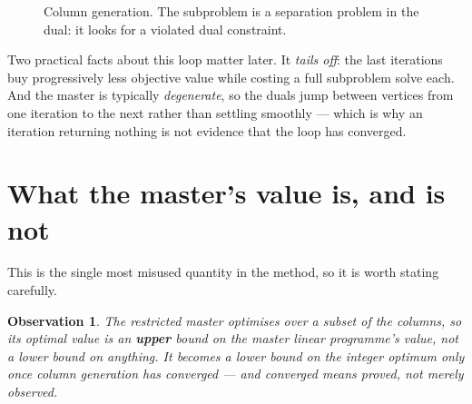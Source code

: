 \documentclass[11pt,a4paper]{article}
\newtheorem{observation}{Observation}
\begin{document}
\begin{figure}[h!]
\centering
{}
\caption{Column generation. The subproblem is a separation problem in the dual:
it looks for a violated dual constraint.}
\end{figure}

Two practical facts about this loop matter later. It \emph{tails off}: the last
iterations buy progressively less objective value while costing a full
subproblem solve each. And the master is typically \emph{degenerate}, so the
duals jump between vertices from one iteration to the next rather than settling
smoothly --- which is why an iteration returning nothing is not evidence that
the loop has converged.

\section{What the master's value is, and is not}

This is the single most misused quantity in the method, so it is worth stating
carefully.

\begin{observation}
The restricted master optimises over a \emph{subset} of the columns, so its
optimal value is an \textbf{upper} bound on the master linear programme's value,
not a lower bound on anything. It becomes a lower bound on the integer optimum
only once column generation has converged --- and \emph{converged} means proved,
not merely observed.
\end{observation}
\end{document}
